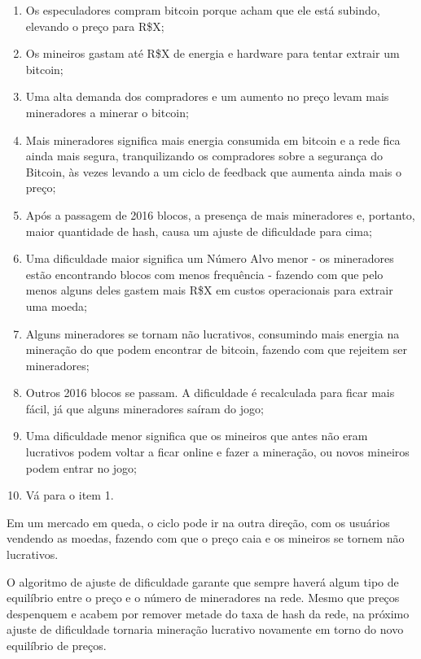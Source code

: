 \begin{enumerate}
\item Os especuladores compram bitcoin porque acham que ele está subindo, elevando o preço para R\$X;
\item Os mineiros gastam até R\$X de energia e hardware para tentar extrair um bitcoin;
\item Uma alta demanda dos compradores e um aumento no preço levam mais mineradores a minerar o bitcoin;
\item Mais mineradores significa mais energia consumida em bitcoin e a rede fica ainda mais segura, tranquilizando os compradores sobre a segurança do Bitcoin, às vezes levando a um ciclo de feedback que aumenta ainda mais o preço;
\item Após a passagem de 2016 blocos, a presença de mais mineradores e, portanto, maior quantidade de hash, causa um ajuste de dificuldade para cima;
\item Uma dificuldade maior significa um Número Alvo menor - os mineradores estão encontrando blocos com menos frequência - fazendo com que pelo menos alguns deles gastem mais R\$X em custos operacionais para extrair uma moeda;
\item Alguns mineradores se tornam não lucrativos, consumindo mais energia na mineração do que podem encontrar de bitcoin, fazendo com que rejeitem ser mineradores;
\item Outros 2016 blocos se passam. A dificuldade é recalculada para ficar mais fácil, já que alguns mineradores saíram do jogo;
\item Uma dificuldade menor significa que os mineiros que antes não eram lucrativos podem voltar a ficar online e fazer a mineração, ou novos mineiros podem entrar no jogo;
\item Vá para o item 1.
\end{enumerate}

Em um mercado em queda, o ciclo pode ir na outra direção, com os usuários vendendo as moedas, fazendo com que o preço caia e os mineiros se tornem não lucrativos.

O algoritmo de ajuste de dificuldade garante que sempre haverá algum tipo de equilíbrio entre o preço e o número de mineradores na rede. 
Mesmo que preços despenquem e acabem por remover metade do taxa de hash da rede, na próximo ajuste de dificuldade tornaria mineração lucrativo novamente em torno do novo equilíbrio de preços.

